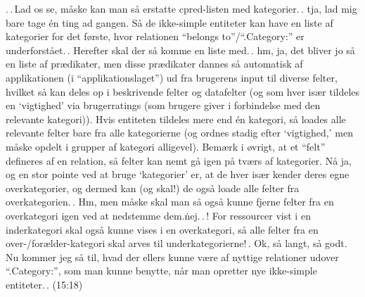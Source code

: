 \documentclass{report}
\begin{document}
.\,.\,Lad os se, måske kan man så erstatte cpred-listen med kategorier.\,. tja, lad mig bare tage én ting ad gangen. Så de ikke-simple entiteter kan have en liste af kategorier for det første, hvor relationen ``belongs to''/``.Category:'' er underforstået.\,. Herefter skal der så komme en liste med.\,. hm, ja, det bliver jo så en liste af prædikater, men disse prædikater dannes så automatisk af applikationen (i ``applikationslaget'') ud fra brugerens input til diverse felter, hvilket så kan deles op i beskrivende felter og datafelter (og som hver især tildeles en `vigtighed' via brugerratings (som brugere giver i forbindelse med den relevante kategori)). Hvis entiteten tildeles mere end én kategori, så loades alle relevante felter bare fra alle kategorierne (og ordnes stadig efter `vigtighed,' men måske opdelt i grupper af kategori alligevel). Bemærk i øvrigt, at et ``felt'' defineres af en relation, så felter kan nemt gå igen på tværs af kategorier. Nå ja, og en stor pointe ved at bruge `kategorier' er, at de hver især kender deres egne overkategorier, og dermed kan (og skal!) de også loade alle felter fra overkategorien.\,. Hm, men måske skal man så også kunne fjerne felter fra en overkategori igen ved at nedstemme dem.\. nej.\,.\,! For ressourcer vist i en inderkategori skal også kunne vises i en overkategori, så alle felter fra en over-/forælder-kategori skal arves til underkategorierne!\,. Ok, så langt, så godt. Nu kommer jeg så til, hvad der ellers kunne være af nyttige relationer udover ``.Category:'', som man kunne benytte, når man opretter nye ikke-simple entiteter.\,. (15:18)
\end{document}
